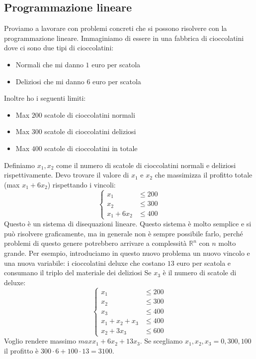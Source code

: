 \documentclass[a4paper]{article}
\begin{document}
\subsection{Programmazione lineare}

Proviamo a lavorare con problemi concreti che si possono risolvere con la programmazione lineare.
Immaginiamo di essere in una fabbrica di cioccolatini dove ci sono due tipi di cioccolatini:
\begin{itemize}
  \item Normali che mi danno $1$ euro per scatola
  \item Deliziosi che mi danno $6$ euro per scatola
\end{itemize}
Inoltre ho i seguenti limiti:
\begin{itemize}
  \item Max $200$ scatole di cioccolatini normali
  \item Max $300$ scatole di cioccolatini deliziosi
  \item Max $400$ scatole di cioccolatini in totale
\end{itemize}
Definiamo $x_1, x_2$ come il numero di scatole di cioccolatini normali e deliziosi rispettivamente. Devo trovare il valore di $x_1$ e $x_2$ che massimizza il profitto totale (max $x_1 + 6x_2$) rispettando i vincoli:
\[
\begin{cases}
  x_1 & \le 200 \\
  x_2 & \le 300 \\
  x_1 + 6x_2 & \le 400
\end{cases}
\]
Questo è un sistema di disequazioni lineare. 
Questo sistema è molto semplice e si può risolvere graficamente, ma in generale non è sempre possibile farlo, perché problemi di questo genere potrebbero 
arrivare a complessità $\mathbb{R}^n$ con $n$ molto grande. 
Per esempio, introduciamo in questo nuovo problema un nuovo vincolo e una nuova variabile: i cioccolatini deluxe che costano $13$ euro per scatola e consumano il triplo del materiale dei deliziosi
Se $x_3$ è il numero di scatole di deluxe:
\[
\begin{cases}
  x_1 & \le 200 \\
  x_2 & \le 300 \\
  x_3 & \le 400 \\
  x_1 + x_2 + x_3 & \le 400\\
  x_2 + 3x_3 & \le 600
\end{cases}
\]
Voglio rendere massimo $max x_1 + 6x_2 + 13x_3$. 
Se scegliamo $x_1, x_2, x_3 = 0,300,100$ il profitto è $300 \cdot 6 + 100 \cdot 13 = 3100$.
\end{document}
